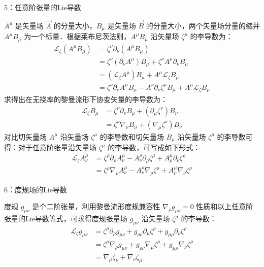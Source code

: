 5：任意阶张量的Lie导数

$A^{\mu}$ 是矢量场 $\overrightarrow{A}$ 的分量大小，$B_{\mu}$ 是矢量场 $\overrightarrow{B}$ 的分量大小，两个矢量场分量的缩并 $A^{\mu}B_{\mu}$ 为一个标量．根据莱布尼茨法则，$A^{\mu}B_{\mu}$ 沿矢量场 $\zeta^{\mu}$ 的李导数为：
$$\begin{aligned}
\mathcal{L}_{\zeta}\left(A^{\mu} B_{\mu}\right) &=\zeta^{\nu} \partial_{\nu}\left(A^{\mu} B_{\mu}\right) \\
&=\zeta^{\nu} (\partial_{\nu} A^{\mu}) B_{\mu}+\zeta^{\nu} A^{\mu} \partial_{\nu} B_{\mu} \\
&=(\mathcal{L}_{\zeta} A^{\mu}) B_{\mu}+A^{\mu} \mathcal{L}_{\zeta} B_{\mu} \\
&=\zeta^{\nu} \partial_{\nu} A^{\mu} B_{\mu}-A^{\nu} \partial_{\nu} \zeta^{\mu} B_{\mu}+A^{\mu} \mathcal{L}_{\zeta} B_{\mu }
\end{aligned}$$
求得出在无挠率的黎曼流形下协变矢量的李导数为：
$$\begin{aligned}
\mathcal{L}_{\zeta} B_{\mu} &=\zeta^{\nu} \partial_{\nu} B_{\mu}+(\partial_{\mu} \zeta^{\nu}) B_{\nu} \\
&=\zeta^{\nu} \nabla_{\nu} B_{\mu}+(\nabla_{\mu} \zeta^{\nu}) B_{\nu}
\end{aligned}$$
对比切矢量场 $A^{\mu}$ 沿矢量场 $\zeta^{\mu}$ 的李导数和切矢量场 $B_{\mu}$ 沿矢量场 $\zeta^{\mu}$ 的李导数可得：对于任意阶张量沿矢量场 $\zeta^{\mu}$ 的李导数，可写成如下形式：
$$\begin{aligned}
\mathcal{L}_{\zeta} A_{\nu}^{\mu} &=\zeta^{\rho} \partial_{\rho} A_{\nu}^{\mu}-A_{\nu}^{\rho} \partial_{\rho} \zeta^{\mu}+A_{\rho}^{\mu} \partial_{\nu} \zeta^{\rho} \\
&=\zeta^{\rho} \nabla_{\rho} A_{\nu}^{\mu}-A_{\nu}^{\rho} \nabla_{\rho} \zeta^{\mu}+A_{\rho}^{\mu} \nabla_{\nu} \zeta^{\rho}
\end{aligned}$$

6：度规场的Lie导数

度规 $g_{\mu \nu}$ 是个二阶张量，利用黎曼流形度规兼容性 $\nabla_{\rho} g_{\mu \nu}=0$ 性质和以上任意阶张量的Lie导数等式，可求得度规张量场 $g_{\mu \nu}$ 沿矢量场 $\zeta^{\mu}$ 的李导数：
$$\begin{aligned}
\mathcal{L}_{\zeta} g_{\mu \nu} 
&=\zeta^{\rho} \partial_{\rho} g_{\mu \nu}+g_{\rho \nu} \partial_{\mu} \zeta^{\rho}+g_{\mu \rho} \partial_{\nu} \zeta^{\rho} \\
&=\zeta^{\rho} \nabla_{\rho} g_{\mu \nu}+g_{\rho \nu} \nabla_{\mu} \zeta^{\rho}+g_{\mu \rho} \nabla_{\nu} \zeta^{\rho} \\
&=\nabla_{\mu} \zeta_{\nu}+\nabla_{\nu} \zeta_{\mu} 
\end{aligned}$$

